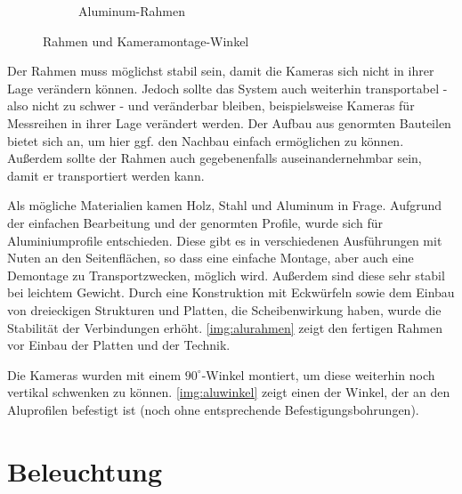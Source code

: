 \documentclass[./00PhotoBox.tex]{subfiles}
\begin{document}
\begin{figure}
\begin{subfigure}{0.45\textwidth}
        \centering
        \caption{Aluminum-Rahmen} %
        \label{img:alurahmen} %
    \end{subfigure}
    \caption{Rahmen und Kameramontage-Winkel} %
\end{figure}

Der Rahmen muss möglichst stabil sein, damit die Kameras sich nicht in ihrer Lage verändern können. Jedoch sollte das System auch weiterhin transportabel - also nicht zu schwer - und veränderbar bleiben, beispielsweise Kameras für Messreihen in ihrer Lage verändert werden. Der Aufbau aus genormten Bauteilen bietet sich an, um hier ggf. den Nachbau einfach ermöglichen zu können. Außerdem sollte der Rahmen auch gegebenenfalls auseinandernehmbar sein, damit er transportiert werden kann.

Als mögliche Materialien kamen Holz, Stahl und Aluminum in Frage. Aufgrund der einfachen Bearbeitung und der genormten Profile, wurde sich für Aluminiumprofile entschieden. Diese gibt es in verschiedenen Ausführungen mit Nuten an den Seitenflächen, so dass eine einfache Montage, aber auch eine Demontage zu Transportzwecken, möglich wird. Außerdem sind diese sehr stabil bei leichtem Gewicht. Durch eine Konstruktion mit Eckwürfeln sowie dem Einbau von dreieckigen Strukturen und Platten, die Scheibenwirkung haben, wurde die Stabilität der Verbindungen erhöht. \autoref{img:alurahmen} zeigt den fertigen Rahmen vor Einbau der Platten und der Technik.

Die Kameras wurden mit einem $90^\circ$-Winkel montiert, um diese weiterhin noch vertikal schwenken zu können. \autoref{img:aluwinkel} zeigt einen der Winkel, der an den Aluprofilen befestigt ist (noch ohne entsprechende Befestigungsbohrungen).


\section{Beleuchtung}
\end{document}
